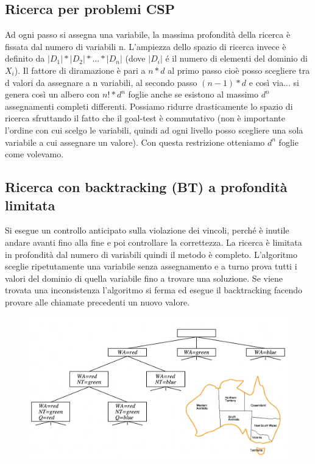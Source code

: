 \documentclass{article}
\begin{document}
\subsection{Ricerca per problemi CSP}
Ad ogni passo si assegna una variabile, la massima profondità della ricerca è fissata dal numero di variabili n. L’ampiezza dello spazio di ricerca invece è definito da $|D_1| * |D_2| * ... * |D_n|$ (dove $|D_i|$ é il numero di elementi del dominio di $X_i$). Il fattore di diramazione è pari a $n*d$ al primo passo cioè posso scegliere tra d valori da assegnare a n variabili, al secondo passo $(n-1)*d$ e così via... si genera così un albero con $n! * d^n$ foglie anche se esistono al massimo $d^n$ assegnamenti completi differenti. Possiamo ridurre drasticamente lo spazio di ricerca sfruttando il fatto che il goal-test è commutativo (non è importante l’ordine con cui scelgo le variabili, quindi ad ogni livello posso scegliere una sola variabile a cui assegnare un valore). Con questa restrizione otteniamo $d^n$ foglie come volevamo.

\subsection{Ricerca con backtracking (BT) a profondità limitata}
Si esegue un controllo anticipato sulla violazione dei vincoli, perché è inutile andare avanti fino alla fine e poi controllare la correttezza. La ricerca è limitata in profondità dal numero di variabili quindi il metodo è completo. L'algoritmo sceglie ripetutamente una variabile senza assegnamento e a turno prova tutti i valori del dominio di quella variabile fino a trovare una soluzione. Se viene trovata una inconsistenza l'algoritmo si ferma ed esegue il backtracking facendo provare alle chiamate precedenti un nuovo valore.
\begin{figure}[H]
\centering
\includegraphics[scale=0.35]{Images/mappacoloratabacktracking.png}
\end{figure}
\end{document}
